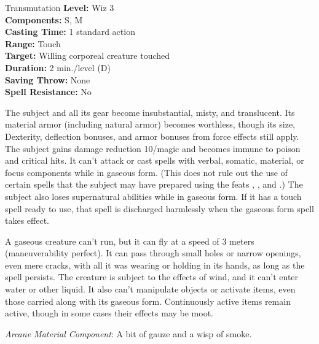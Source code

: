 {Transmutation}
{
	\textbf{Level:}
	Wiz 3\\
	\textbf{Components:}
	S, M\\
	\textbf{Casting Time:}
	1 standard action\\
	\textbf{Range:}
	Touch\\
	\textbf{Target:}
	Willing corporeal creature touched\\
	\textbf{Duration:}
	2 min./level (D)\\
	\textbf{Saving Throw:}
	None\\
	\textbf{Spell Resistance:}
	No\\
}
{
	The subject and all its gear become insubstantial, misty, and translucent. Its material armor (including natural armor) becomes worthless, though its size, Dexterity, deflection bonuses, and armor bonuses from force effects still apply. The subject gains damage reduction 10/magic and becomes immune to poison and critical hits. It can't attack or cast spells with verbal, somatic, material, or focus components while in gaseous form. (This does not rule out the use of certain spells that the subject may have prepared using the feats , , and .) The subject also loses supernatural abilities while in gaseous form. If it has a touch spell ready to use, that spell is discharged harmlessly when the gaseous form spell takes effect.

	A gaseous creature can't run, but it can fly at a speed of 3 meters (maneuverability perfect). It can pass through small holes or narrow openings, even mere cracks, with all it was wearing or holding in its hands, as long as the spell persists. The creature is subject to the effects of wind, and it can't enter water or other liquid. It also can't manipulate objects or activate items, even those carried along with its gaseous form. Continuously active items remain active, though in some cases their effects may be moot.

	\textit{Arcane Material Component}:
	A bit of gauze and a wisp of smoke.

}
